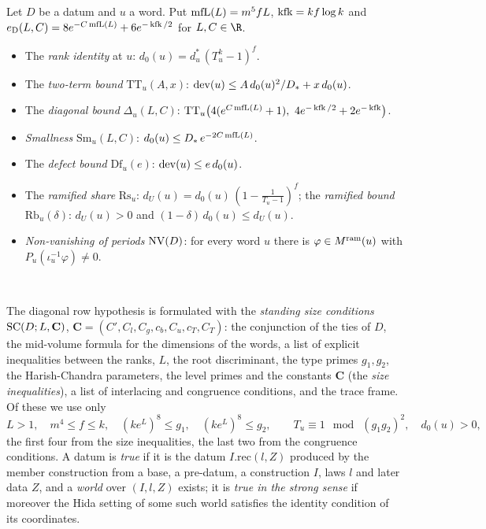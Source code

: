 \begin{definition}\label{pf:open0a:def:diag}
Let $D$ be a datum and $u$ a word. Put $\operatorname{mfL}(L)=m^5fL$, $\operatorname{kfk}=kf\log k$ and
$e_{\mathrm{D}}(L,C)=8e^{-C\operatorname{mfL}(L)}+6e^{-\operatorname{kfk}/2}$ for $L,C\in\R$.
\begin{itemize}
\item The \emph{rank identity} at $u$: $d_0(u)=d_u^*\,(T_u^k-1)^f$.
\item The \emph{two-term bound} $\mathrm{TT}_u(A,x)$: $\operatorname{dev}(u)\le A\,d_0(u)^2/D_*+x\,d_0(u)$.
\item The \emph{diagonal bound} $\Delta_u(L,C)$: $\mathrm{TT}_u\bigl(4(e^{C\operatorname{mfL}(L)}+1),\
4e^{-\operatorname{kfk}/2}+2e^{-\operatorname{kfk}}\bigr)$.
\item \emph{Smallness} $\mathrm{Sm}_u(L,C)$: $d_0(u)\le D_*\,e^{-2C\operatorname{mfL}(L)}$.
\item The \emph{defect bound} $\mathrm{Df}_u(e)$: $\operatorname{dev}(u)\le e\,d_0(u)$.
\item The \emph{ramified share} $\mathrm{Rs}_u$: $d_U(u)=d_0(u)\,(1-\frac1{T_u-1})^f$; the \emph{ramified bound}
$\mathrm{Rb}_u(\delta)$: $d_U(u)>0$ and $(1-\delta)\,d_0(u)\le d_U(u)$.
\item \emph{Non-vanishing of periods} $\mathrm{NV}(D)$: for every word $u$ there is $\varphi\in M^{\mathrm{ram}}(u)$ with
$P_u(\iota_u^{-1}\varphi)\ne0$.
\end{itemize}
\ \ 
\end{definition}

The diagonal row hypothesis is formulated with the \emph{standing size conditions}
$\mathrm{SC}(D;L,\mathbf C)$, $\mathbf C=(C',C_l,C_g,c_b,C_u,c_T,C_T)$: the conjunction of the ties of $D$, the
mid-volume formula for the dimensions of the words, a list of explicit inequalities between the ranks, $L$, the root
discriminant, the type primes $g_1,g_2$, the Harish-Chandra parameters, the level primes and the constants
$\mathbf C$ (the \emph{size inequalities}), a list of interlacing and congruence conditions, and the trace frame. Of
these we use only
\begin{equation}\label{pf:open0a:eq:HDused}
L>1,\quad m^4\le f\le k,\quad (ke^L)^8\le g_1,\quad (ke^L)^8\le g_2,\qquad
T_u\equiv1\ \bmod\ (g_1g_2)^2,\quad d_0(u)>0,
\end{equation}
the first four from the size inequalities, the last two from the congruence conditions. A datum is \emph{true} if it
is the datum $I.\mathrm{rec}(l,Z)$ produced by the member construction from a base, a pre-datum, a construction $I$,
laws $l$ and later data $Z$, and a \emph{world} over $(I,l,Z)$ exists; it is \emph{true in the strong sense} if
moreover the Hida setting of some such world satisfies the identity condition of its coordinates.

